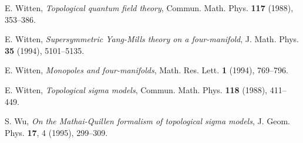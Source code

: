 \documentclass[a4paper,12pt,reqno,sumlimits]{amsart}
\theoremstyle{plain}
\theoremstyle{definition}
\providecommand{\1}{{\bf 1}}
\numberwithin{equation}{section}
\begin{document}
\begin{thebibliography}{999}
 E. Witten, {\em Topological quantum field theory},
  Commun. Math. Phys. {\bf 117} (1988), 353--386.
  
 E. Witten, {\em Supersymmetric Yang-Mills theory on a
    four-manifold}, J. Math. Phys. {\bf 35} (1994), 5101--5135.
  
 E. Witten, {\em Monopoles and four-manifolds}, Math. Res.
  Lett. {\bf 1} (1994), 769--796.
  
 E. Witten, {\em Topological sigma models}, Commun. Math.
  Phys. {\bf 118} (1988), 411--449.
  
 S. Wu, {\em On the Mathai-Quillen formalism of topological sigma
    models}, J. Geom. Phys. {\bf 17}, 4 (1995), 299--309.

\end{thebibliography}
  
\end{document}
